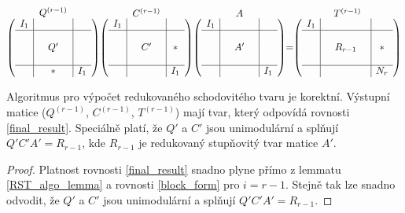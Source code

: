 \begin{align} \label{final_result}
    \stackrel{\mbox{$Q^{(r - 1)}$}}{
        \left(
        \begin{array}{c|ccc|c}
          I_1 & &      & &  \\ \hline
              & &      & &  \\
              & &  Q'  & &  \\
              & &      & &  \\ \hline
              & & \ast & & I_1 \\
        \end{array}
        \right)
    }
    \stackrel{\mbox{$C^{(r - 1)}$}}{
        \left(
        \begin{array}{c|ccc|c}
          I_1 & &      & &  \\ \hline
              & &      & &  \\
              & &  C'  & & \ast  \\
              & &      & &  \\ \hline
              & &      & & I_1 \\
        \end{array}
        \right)
    }
    \stackrel{\mbox{$A$}}{
        \left(
        \begin{array}{c|ccc|c}
          I_1 & &      & &  \\ \hline
              & &      & &  \\
              & &  A'  & &  \\
              & &      & &  \\ \hline
              & &      & & I_1 \\
        \end{array}
        \right)
    }
    =
    \stackrel{\mbox{$T^{(r - 1)}$}}{
        \left(
        \begin{array}{c|ccc|ccc}
          I_1 & &             & &      \\ \hline
              & &             & &      \\
              & &  R_{r - 1}  & & \ast \\
              & &             & &      \\ \hline
              & &             & & N_r  \\
        \end{array}
        \right)
    }
\end{align}

\begin{vet} \label{RST_algo}
Algoritmus pro výpočet redukovaného schodovitého tvaru je korektní. Výstupní
matice ($ Q^{(r - 1)} $, $ C^{(r - 1)} $, $ T^{(r - 1)} $) mají tvar,
který odpovídá rovnosti \ref{final_result}. Speciálně platí, že $ Q' $ a $ C' $
jsou unimodulární a splňují $ Q'C'A' = R_{r - 1} $, kde $ R_{r - 1} $ je
redukovaný stupňovitý tvar matice $ A' $.
\end{vet}
\begin{proof}
Platnost rovnosti \ref{final_result} snadno plyne přímo z lemmatu
\ref{RST_algo_lemma} a rovnosti \ref{block_form} pro $ i = r - 1 $. Stejně tak
lze snadno odvodit, že $ Q' $ a $ C' $ jsou unimodulární a splňují
$ Q'C'A' = R_{r - 1} $.
\end{proof}


\cleardoublepage

